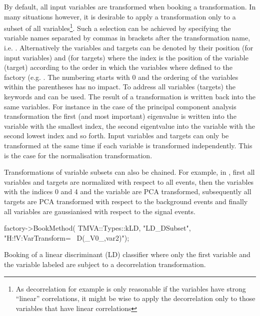 By default, all input variables are transformed when booking a
transformation. In many situations however, it is desirable to apply a
transformation only to a subset of all variables\footnote{As
  decorrelation for example is only reasonable if the variables have
  strong ``linear'' correlations, it might be wise to apply the
  decorrelation only to those variables that have linear
  correlations}.  Such a selection can be achieved by specifying the
variable names separated by commas in brackets after the
transformation name,
i.e. . Alternatively the
variables and targets can be denoted by their position
 (for input variables) and  (for
targets) where the index is the position of the variable (target)
according to the order in which the variables where defined to the
factory (e.g. .  The numbering
starts with 0 and the ordering of the variables within the parentheses
has no impact.  To address all variables (targets) the keywords
 and  can be used.  The result of a transformation
is written back into the same variables. For instance in the case of
the principal component analysis transformation the first (and most
important) eigenvalue is written into the variable with the smallest
index, the second eigentvalue into the variable with the second lowest
index and so forth. Input variables and targets can only be
transformed at the same time if each variable is transformed
independently. This is the case for the normalisation transformation.

Transformations of variable subsets can also be chained. For example,
in ,
first all variables and targets are normalized with respect to all
events, then the variables with the indices 0 and 4 and the variable
 are PCA transformed, subsequently all targets are PCA
transformed with respect to the background events and finally all
variables are gaussianised with respect to the signal events.

\begin{codeexample}
\begin{tmvacode}
factory->BookMethod( TMVA::Types::kLD, "LD_DSubset", "H:!V:VarTransform= \
D(_V0_,var2)");
\end{tmvacode}
\caption[.]{\codeexampleCaptionSize Booking of a linear discriminant
  (LD) classifier where only the first variable and the variable
  labeled \code{var2} are subject to a decorrelation transformation.
}
\end{codeexample}

